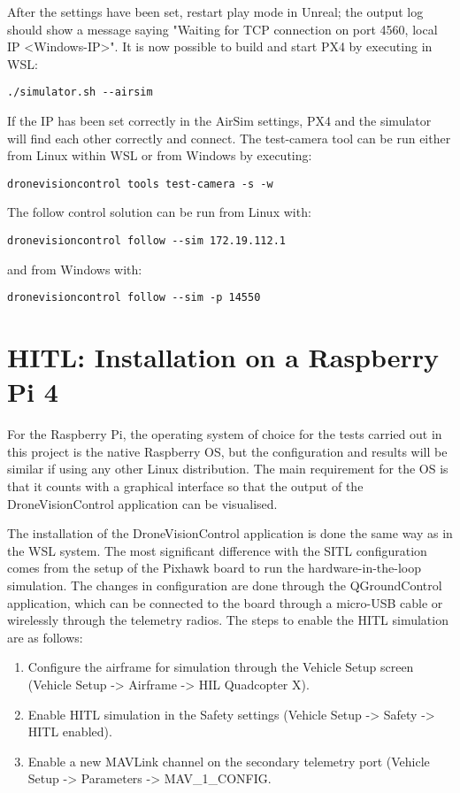 After the settings have been set, restart play mode in Unreal; the output log should show a message saying "Waiting for TCP connection on port 4560, local IP <Windows-IP>".
It is now possible to build and start PX4 by executing in WSL:
\begin{verbatim}
./simulator.sh --airsim
\end{verbatim}

If the IP has been set correctly in the AirSim settings, 
PX4 and the simulator will find each other correctly and connect.
The test-camera tool can be run either from Linux within WSL or from Windows by executing:
\begin{verbatim}
dronevisioncontrol tools test-camera -s -w
\end{verbatim}

The follow control solution can be run from Linux with:
\begin{verbatim}
dronevisioncontrol follow --sim 172.19.112.1
\end{verbatim}
and from Windows with:
\begin{verbatim}
dronevisioncontrol follow --sim -p 14550
\end{verbatim}

\section{HITL: Installation on a Raspberry Pi 4}
\label{app:install-hitl}

For the Raspberry Pi, the operating system of choice for the tests carried out in this project is the native Raspberry OS, but the configuration and results will be similar if using any other Linux distribution. The main requirement for the OS is that it counts with a graphical interface so that the output of the DroneVisionControl application can be visualised.

The installation of the DroneVisionControl application is done the same way as in the WSL system. The most significant difference with the SITL configuration comes from the setup of the Pixhawk board to run the hardware-in-the-loop simulation. The changes in configuration are done through the QGroundControl application, which can be connected to the board through a micro-USB cable or wirelessly through the telemetry radios. The steps to enable the HITL simulation are as follows:
\begin{enumerate}
    \item Configure the airframe for simulation through the Vehicle Setup screen (Vehicle Setup -> Airframe -> HIL Quadcopter X).
    \item Enable HITL simulation in the Safety settings (Vehicle Setup -> Safety -> HITL enabled).
    \item Enable a new MAVLink channel on the secondary telemetry port (Vehicle Setup -> Parameters -> MAV\_1\_CONFIG.
\end{enumerate}

